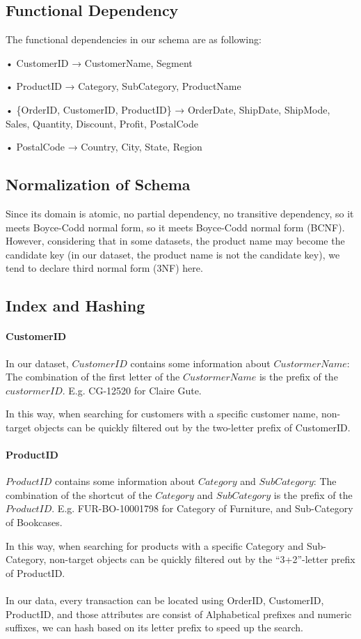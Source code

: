 \subsection{Functional Dependency}
\label{sect:sub-title}
The functional dependencies in our schema are as following:\par
• CustomerID → CustomerName, Segment \par
• ProductID → Category, SubCategory, ProductName\par
• \{OrderID, CustomerID, ProductID\} →  OrderDate, ShipDate, ShipMode, Sales, Quantity, Discount, Profit, PostalCode\par
• PostalCode → Country, City, State, Region \par

\subsection{Normalization of Schema}
\label{sect:sub-title}
Since its domain is atomic, no partial dependency, no transitive dependency, so it meets Boyce-Codd normal form, so it meets Boyce-Codd normal form (BCNF). However, considering that in some datasets, the product name may become the candidate key (in our dataset, the product name is not the candidate key), we tend to declare third normal form (3NF) here.

\subsection{Index and Hashing}
\label{sect:sub-title}
\paragraph{CustomerID}
In our dataset, $CustomerID$ contains some information about $CustormerName$: The combination of the first letter of the $CustormerName$ is the prefix of the $custormerID$. E.g. CG-12520 for Claire Gute. \par
In this way, when searching for customers with a specific customer name, non-target objects can be quickly filtered out by the two-letter prefix of CustomerID.

\paragraph{ProductID}
$ProductID$ contains some information about $Category$ and $SubCategory$: The combination of the shortcut of the $Category$ and $SubCategory$ is the prefix of the $ProductID$. E.g. FUR-BO-10001798 for Category of Furniture, and Sub-Category of Bookcases. \par
In this way, when searching for products with a specific Category and Sub-Category, non-target objects can be quickly filtered out by the “3+2”-letter prefix of ProductID. 
\\
\\
In our data, every transaction can be located using {OrderID, CustomerID, ProductID}, and those attributes are consist of Alphabetical prefixes and numeric suffixes, we can hash based on its letter prefix to speed up the search.
